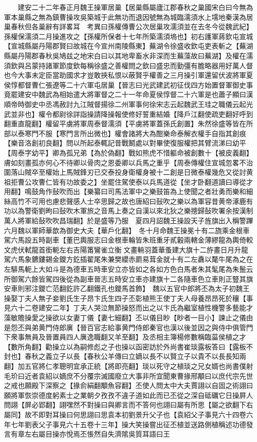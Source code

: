 　　建安二十二年春正月魏王操軍居巢【居巢縣屬廬江郡春秋之巢國宋白曰今無為軍本巢縣之無為鎮曹操攻吳築城于此無功而退因號無為城臨濡須水上壖地秦漢為居巢春秋但各巢辭有詳畧耳　考異曰孫權傳曹公次居巢攻濡須並在去冬今從魏武紀】孫權保濡須二月操進攻之【孫權所保者十七年所築濡須塢也】初右護軍蔣欽屯宣城【宣城縣屬丹陽郡賢曰故城在今宣州南陵縣東】蕪湖令徐盛收欽屯吏表斬之【蕪湖縣屬丹陽郡春秋吳鳩兹之地宋白曰以其地卑畜水非深而生蕪藻故曰蕪湖】及權在濡須欽與呂蒙持諸軍節度欽每稱徐盛之善權問之欽曰盛忠而勤彊有膽略器用好萬人督也今大事未定臣當助國求才豈敢挾私恨以蔽賢乎權善之三月操引軍還留伏波將軍夏侯惇都督曹仁張遼等二十六軍屯居巢【晉志曰光武建武初征伐四方始置督軍御史事竟罷建安中魏武為相始遣大將軍督之二十一年命夏侯惇督二十六軍是也蕭子顯曰漢順帝時御史中丞馮赦討九江賊督揚徐二州軍事何徐宋志云起魏武王珪之職儀云起光武並非也】權令都尉徐詳詣操請降操報使修好誓重結婚【降戶江翻使疏吏翻好呼到翻重直龍翻】權留平虜將軍周泰督濡須【平虜將軍蓋孫氏創置】朱然徐盛等皆在所部以泰寒門不服【寒門言所出微也】權會諸將大為酣樂命泰解衣權手自指其創痕【樂音洛創初良翻】問以所起泰輒記昔戰鬭處以對畢使復服權把其臂流涕曰幼平【周泰字幼平】卿為孤兄弟【為於偽翻】戰如熊虎不惜軀命被創數十【被皮義翻】膚如刻畫孤亦何心不待卿以骨肉之恩委卿以兵馬之重乎【周泰傳權住宣城忽畧不治圍落山賊卒至權始上馬賊鋒刃已交泰投身衛權身被十二創是日微泰權幾危又從討黄祖拒曹公攻曹仁皆有功故委之】坐罷住駕使泰以兵馬道從【坐才卧翻道讀曰導從才用翻】鳴鼓角作鼔吹而出【樂纂曰司馬法軍中之樂鼓笛為上使聞之者壯勇而樂和細絲高竹不可用也慮悲聲感人士卒思歸之故也唐紹曰鼔吹之樂以為軍容昔黄帝涿鹿有功以為警衛劉昫曰鼔吹木軍旅之音馬上奏之自漢以來北狄之樂摠歸鼔吹署余按漢制萬人將軍給鼔吹吹昌瑞翻】於是盛等乃服　夏四月詔魏王操設天子旌旗出入稱警蹕　六月魏以軍師華歆為御史大夫【華戶化翻】　冬十月命魏王操冕十有二旒乘金根車駕六馬設五時副車【董巴輿服志曰金根車輪皆朱班重牙貳轂兩轄金薄繆龍為輿倚較文虎伏軾龍首銜軛左右吉陽筩鸞雀立衡文畫輈羽蓋華蚤建大旗十二斿畫日月升龍駕六馬象鑣鏤錫金鑁方釳插翟尾朱兼樊纓赤罽易茸金就十有二左纛以氂牛尾為之在左騑馬軛上大如斗是為德車五時車安立亦皆如之各如方色白馬者朱其髦尾為朱鬛云所御駕六餘皆駕四後從為副車晉志五時安立車亦建旗十二各隨車色立車則正豎其旗安車則邪注鑁亡范翻釳許乙翻鐵孔也鑁馬首飾】　魏以五官中郎將丕為太子初魏王操娶丁夫人無子妾劉氏生子昂卞氏生四子丕彰植熊王使丁夫人母養昂昂死於穰【事見六十二卷建安二年】丁夫人哭泣無節操怒而出之以卞氏為繼室植性機警多藝能才藻敏贍操愛之操欲以女妻丁儀【妻七細翻】丕以儀目眇【眇者一目小】諫止之儀由是怨丕與弟黄門侍郎廙【晉百官志給事黄門侍郎秦官也漢以後並因之與侍中俱管門下衆事無員及晉置員四人廙逸職翻又羊至翻】及丞相主簿楊修數稱臨菑侯植之才【數所角翻】勸操立以為嗣修彪之子也操以函密訪於外尚書崔琰露板答曰【露板不封也】春秋之義立子以長【春秋公羊傳曰立嫡以長不以賢立子以貴不以長長知兩翻】加五官將仁孝聰明宜承正統【將即亮翻】琰以死守之植琰之兄女婿也尚書僕射毛玠曰近者袁紹以嫡庶不分覆宗滅國廢立大事非所宜聞東曹掾邢顒曰以庶代宗先世之戒也願殿下深察之【掾俞絹翻顒魚容翻】丕使人問太中大夫賈詡以自固之術詡曰願將軍恢崇德度躬素士之業朝夕孜孜不違子道如此而已丕從之深自砥礪它日操屛人問詡【屏必郢翻】詡嘿然不對操曰與卿言而不答何也詡曰屬有所思【屬之欲翻下右屬同】故不即對耳操曰何思詡曰思袁本初劉景升父子也【袁紹父子事見六十四卷六年七年劉表父子事見六十五卷十三年】操大笑操嘗出征丕植並送路側植稱述功德發言有章左右屬目操亦悅焉丕悵然自失濟隂吳質耳語曰王